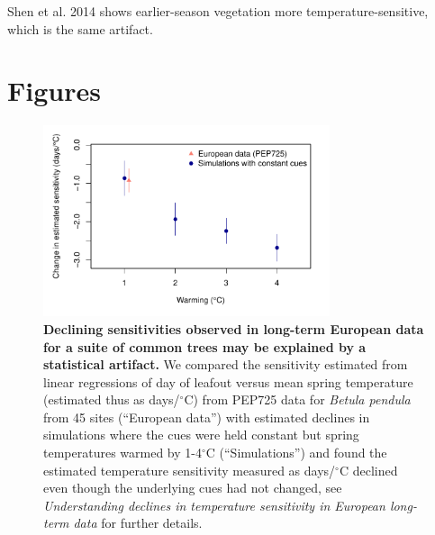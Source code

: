\documentclass[11pt,letter]{article}
\begin{document}
Shen et al. 2014 shows earlier-season vegetation more temperature-sensitive, which is the same artifact. 

\section* {Figures}

\begin{figure}[h!]
\centering
\noindent \includegraphics[width=0.75\textwidth]{..//..//analyses/bb_analysis/PEP_climate/figures/peprealandsims.pdf}
\caption{\textbf{Declining sensitivities observed in long-term European data for a suite of common trees may be explained by a statistical artifact.} We compared the sensitivity estimated from linear regressions of day of leafout versus mean spring temperature (estimated thus as days/$^{\circ}$C) from PEP725 data for \emph{Betula pendula} from 45 sites (``European data'') with estimated declines in simulations where the cues were held constant but spring temperatures warmed by 1-4$^{\circ}$C (``Simulations'') and found the estimated temperature sensitivity measured as days/$^{\circ}$C declined even though the underlying cues had not changed, see \emph{Understanding declines in temperature sensitivity in European long-term data} for further details.}
\label{fig:pepsims}
\end{figure}
\end{document}
